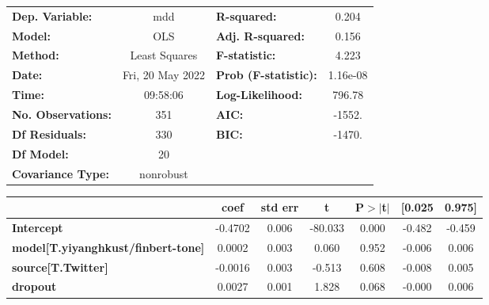 \begin{center}
\begin{tabular}{lclc}
\toprule
\textbf{Dep. Variable:}                    &       mdd        & \textbf{  R-squared:         } &     0.204   \\
\textbf{Model:}                            &       OLS        & \textbf{  Adj. R-squared:    } &     0.156   \\
\textbf{Method:}                           &  Least Squares   & \textbf{  F-statistic:       } &     4.223   \\
\textbf{Date:}                             & Fri, 20 May 2022 & \textbf{  Prob (F-statistic):} &  1.16e-08   \\
\textbf{Time:}                             &     09:58:06     & \textbf{  Log-Likelihood:    } &    796.78   \\
\textbf{No. Observations:}                 &         351      & \textbf{  AIC:               } &    -1552.   \\
\textbf{Df Residuals:}                     &         330      & \textbf{  BIC:               } &    -1470.   \\
\textbf{Df Model:}                         &          20      & \textbf{                     } &             \\
\textbf{Covariance Type:}                  &    nonrobust     & \textbf{                     } &             \\
\bottomrule
\end{tabular}
\begin{tabular}{lcccccc}
                                           & \textbf{coef} & \textbf{std err} & \textbf{t} & \textbf{P$> |$t$|$} & \textbf{[0.025} & \textbf{0.975]}  \\
\midrule
\textbf{Intercept}                         &      -0.4702  &        0.006     &   -80.033  &         0.000        &       -0.482    &       -0.459     \\
\textbf{model[T.yiyanghkust/finbert-tone]} &       0.0002  &        0.003     &     0.060  &         0.952        &       -0.006    &        0.006     \\
\textbf{source[T.Twitter]}                 &      -0.0016  &        0.003     &    -0.513  &         0.608        &       -0.008    &        0.005     \\
\textbf{dropout}                           &       0.0027  &        0.001     &     1.828  &         0.068        &       -0.000    &        0.006     \\

\end{tabular}
\end{center}

